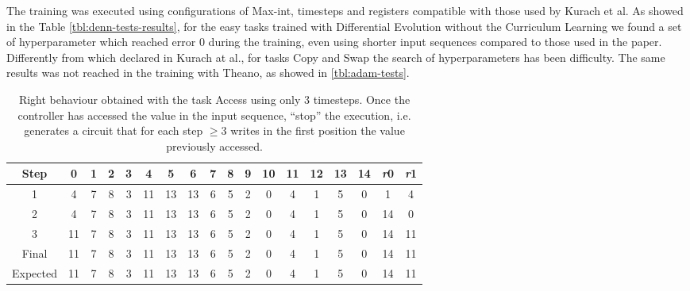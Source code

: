 \iffalse
\begin{figure}[t]
	\centering
	\begin{tikzpicture}[samples=100,smooth, scale=.875]
			\begin{axis}[
 				axis x line=center,
  				axis y line=center,
 				xlabel={Sequence A length},
  				ylabel={Error rate},
    				x label style={at={(axis description cs:0.5,-0.115)},anchor=north},
    				y label style={at={(axis description cs:-0.115,.5)},rotate=90,anchor=south},    				
			    grid=both,
			    grid style={line width=.1pt, draw=gray!10},
			    major grid style={line width=.2pt,draw=gray!50},
			    xtick={10, 20, 30 50, 100, 500, 1000},
			    xmin=0, xmax=1000,
			    ymin=0, ymax=1,
				legend style={at={(0.5,-0.25)},anchor=north}		
			]
  				\addplot table{data/swap-error-rate-CL.txt};
  				\addlegendentry{Swap CL}
			\end{axis}
	\end{tikzpicture}
	\label{fig:nram-tests-error-rate-plot}
	\caption{Error rate of best controllers in generalization tests.}
\end{figure}
\fi
The training was executed using configurations of Max-int, timesteps and registers compatible with those used by Kurach et al. As showed in the Table \ref{tbl:denn-tests-results}, for the easy tasks trained with Differential Evolution without the Curriculum Learning we found a set of hyperparameter which reached error 0 during the training, even using shorter input sequences compared to those used in the paper. Differently from which declared in Kurach at al., for tasks Copy and Swap the search of hyperparameters has been difficulty. The same results was not reached in the training with Theano, as showed in \ref{tbl:adam-tests}. 
\begin{table}[h]
	\centering
	\begin{tabular}{c|ccccccccccccccc|cc}
		\rowcolor{Gray}\textbf{Step} & 0 & 1 & 2 & 3 & 4 & 5 & 6 & 7 & 8 & 9 & 10 & 11 & 12 & 13 & 14 & \textit{r}0 & \textit{r}1 \\ \hline 
1 & 4 & 7 & 8 & 3 & 11 & 13 & 13 & 6 & 5 & 2 & 0 & 4 & 1 & 5 & 0 & 1 & 4 \\ 
2 & 4 & 7 & 8 & 3 & 11 & 13 & 13 & 6 & 5 & 2 & 0 & 4 & 1 & 5 & 0 & 14 & 0 \\ 
3 & 11 & 7 & 8 & 3 & 11 & 13 & 13 & 6 & 5 & 2 & 0 & 4 & 1 & 5 & 0 & 14 & 11 \\ \hline 
\rowcolor{Gray}Final & 11 & 7 & 8 & 3 & 11 & 13 & 13 & 6 & 5 & 2 & 0 & 4 & 1 & 5 & 0 & 14 & 11 \\
\rowcolor{Gray}Expected & 11 & 7 & 8 & 3 & 11 & 13 & 13 & 6 & 5 & 2 & 0 & 4 & 1 & 5 & 0 & 14 & 11 \\
	\end{tabular}
	\label{tbl:right-behaviour}
	\caption{Right behaviour obtained with the task Access using only 3 timesteps. Once the controller has accessed the value in the input sequence, ``stop'' the execution, i.e. generates a circuit that for each step $\geq 3$ writes in the first position the value previously accessed.}
\end{table}
